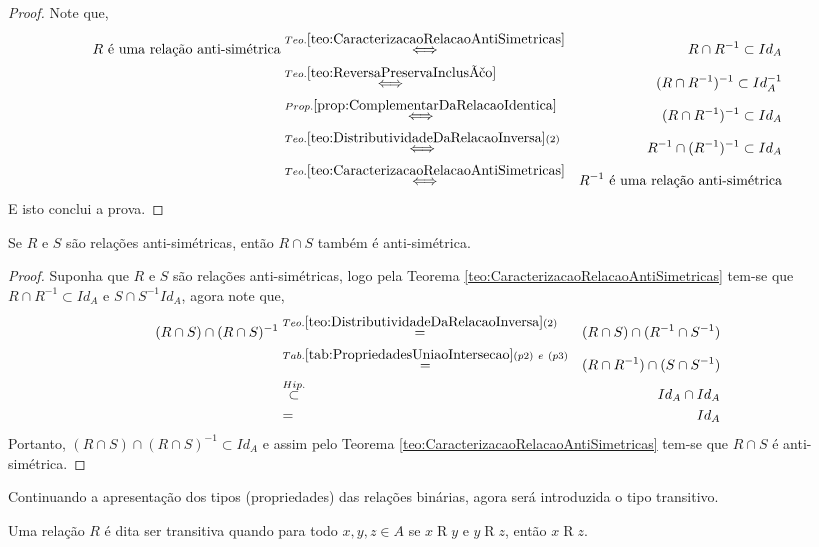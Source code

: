\begin{proof}
	Note que,
	\begin{eqnarray*}
		R \text{ é uma relação anti-simétrica} & \stackrel{Teo. \ref{teo:CaracterizacaoRelacaoAntiSimetricas}}{\Longleftrightarrow }& R \cap R^{-1} \subset Id_A\\
		& \stackrel{Teo. \ref{teo:ReversaPreservaInclusão}}{\Longleftrightarrow} & 		 (R \cap R^{-1})^{-1} \subset Id_A^{-1}\\
		& \stackrel{Prop. \ref{prop:ComplementarDaRelacaoIdentica}}{\Longleftrightarrow} & (R \cap R^{-1})^{-1} \subset Id_A\\
		& \stackrel{Teo. \ref{teo:DistributividadeDaRelacaoInversa}(2)}{\Longleftrightarrow} & R^{-1} \cap (R^{-1})^{-1} \subset Id_A\\
		& \stackrel{Teo. \ref{teo:CaracterizacaoRelacaoAntiSimetricas}}{\Longleftrightarrow }& R^{-1} \text{ é uma relação anti-simétrica} 
	\end{eqnarray*}
	E isto conclui a prova.
\end{proof}

\begin{theorem}
	Se $R$ e $S$ são relações anti-simétricas, então $R \cap S$ também é anti-simétrica.
\end{theorem}

\begin{proof}
	Suponha que $R$ e $S$ são relações anti-simétricas, logo pela Teorema \ref{teo:CaracterizacaoRelacaoAntiSimetricas} tem-se que $R \cap R^{-1} \subset Id_A$ e $S \cap S^{-1} Id_A$, agora note que,
	\begin{eqnarray*}
		(R \cap S) \cap (R \cap S)^{-1} & \stackrel{Teo. \ref{teo:DistributividadeDaRelacaoInversa}(2)}{=} & (R \cap S) \cap (R^{-1} \cap S^{-1})\\
		& \stackrel{Tab. \ref{tab:PropriedadesUniaoIntersecao}(p2) \ e \ (p3)}{=} & (R \cap R^{-1}) \cap (S \cap S^{-1})\\
		& \stackrel{Hip.}{\subset} & Id_A \cap Id_A\\
		& = & Id_A
	\end{eqnarray*}
	Portanto, $(R \cap S) \cap (R \cap S)^{-1} \subset Id_A$ e assim pelo Teorema \ref{teo:CaracterizacaoRelacaoAntiSimetricas} tem-se que $R \cap S$ é anti-simétrica.
\end{proof}

Continuando a apresentação dos tipos (propriedades) das relações binárias, agora será introduzida o tipo transitivo.

\begin{definition}\label{def:RelacaoTransitiva}
	Uma relação $R$ é dita ser transitiva quando para todo $x, y, z \in A$ se $x \mathrel{R} y$ e $y \mathrel{R} z$, então $x \mathrel{R} z$.
\end{definition}

